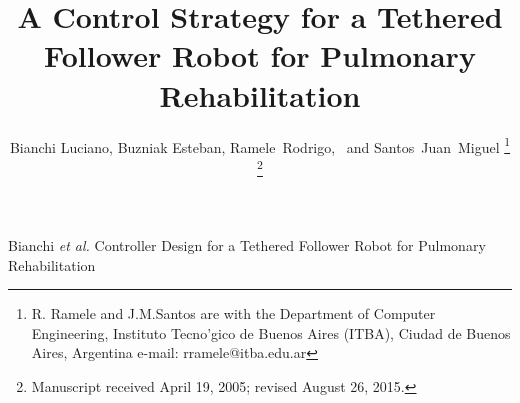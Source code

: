 \documentclass[journal]{IEEEtran}
\begin{document}
%
\title{A Control Strategy for a Tethered Follower Robot for Pulmonary Rehabilitation}
%
%
%

\author{Bianchi Luciano, Buzniak Esteban, Ramele~Rodrigo,~
        and Santos~Juan~Miguel%
\thanks{R. Ramele  and J.M.Santos are with the Department
of  Computer Engineering, Instituto Tecn{o'}gico de Buenos Aires (ITBA), Ciudad de Buenos Aires,  Argentina e-mail: rramele@itba.edu.ar}%
\thanks{Manuscript received April 19, 2005; revised August 26, 2015.}}

% 
%



%
{Bianchi \MakeLowercase{\textit{et al.}} Controller Design for a Tethered Follower Robot for Pulmonary Rehabilitation}
% 
\end{document}
